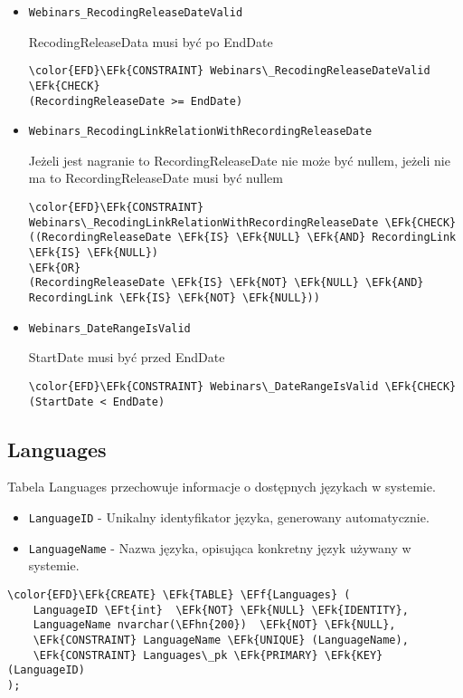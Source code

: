 \documentclass[11pt]{article}
\newcommand{\EFk}[1]{\textcolor{EFk}{\textbf{#1}}} %
\newcommand{\EFf}[1]{\textcolor{EFf}{#1}} %
\newcommand{\EFt}[1]{\textcolor{EFt}{\textbf{#1}}} %
\newcommand{\EFhn}[1]{\textcolor{EFhn}{#1}} %
\begin{document}
\begin{itemize}
\item \texttt{Webinars\_RecodingReleaseDateValid}

RecodingReleaseData musi być po EndDate
\begin{Code}
\begin{Verbatim}
\color{EFD}\EFk{CONSTRAINT} Webinars\_RecodingReleaseDateValid \EFk{CHECK}
(RecordingReleaseDate >= EndDate)
\end{Verbatim}
\end{Code}
\item \texttt{Webinars\_RecodingLinkRelationWithRecordingReleaseDate}

Jeżeli jest nagranie to RecordingReleaseDate nie może być nullem, jeżeli nie ma to RecordingReleaseDate musi być nullem
\begin{Code}
\begin{Verbatim}
\color{EFD}\EFk{CONSTRAINT} Webinars\_RecodingLinkRelationWithRecordingReleaseDate \EFk{CHECK}
((RecordingReleaseDate \EFk{IS} \EFk{NULL} \EFk{AND} RecordingLink \EFk{IS} \EFk{NULL})
\EFk{OR}
(RecordingReleaseDate \EFk{IS} \EFk{NOT} \EFk{NULL} \EFk{AND} RecordingLink \EFk{IS} \EFk{NOT} \EFk{NULL}))
\end{Verbatim}
\end{Code}
\item \texttt{Webinars\_DateRangeIsValid}

StartDate musi być przed EndDate
\begin{Code}
\begin{Verbatim}
\color{EFD}\EFk{CONSTRAINT} Webinars\_DateRangeIsValid \EFk{CHECK}
(StartDate < EndDate)
\end{Verbatim}
\end{Code}
\end{itemize}
\subsection{Languages}
\label{sec:orgb824a52}
Tabela Languages przechowuje informacje o dostępnych językach w systemie.
\begin{itemize}
\item \texttt{LanguageID} - Unikalny identyfikator języka, generowany automatycznie.
\item \texttt{LanguageName} - Nazwa języka, opisująca konkretny język używany w systemie.
\end{itemize}
\begin{Code}
\begin{Verbatim}
\color{EFD}\EFk{CREATE} \EFk{TABLE} \EFf{Languages} (
    LanguageID \EFt{int}  \EFk{NOT} \EFk{NULL} \EFk{IDENTITY},
    LanguageName nvarchar(\EFhn{200})  \EFk{NOT} \EFk{NULL},
    \EFk{CONSTRAINT} LanguageName \EFk{UNIQUE} (LanguageName),
    \EFk{CONSTRAINT} Languages\_pk \EFk{PRIMARY} \EFk{KEY}  (LanguageID)
);
\end{Verbatim}
\end{Code}
\end{document}
